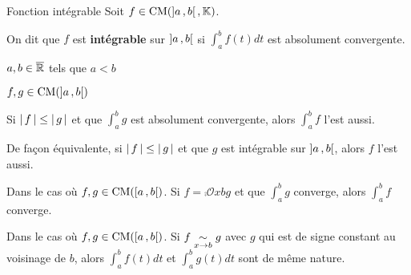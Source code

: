     \begin{defi}{Fonction intégrable}{}
        Soit $f \in \operatorname{CM}(\left] a \, , b \right[, \mathbb{K})$.
    
        On dit que $f$ est \textbf{intégrable} sur $\left] a \, , b \right[$ si $\int_{a}^{b} f(t)dt$ est absolument convergente.
    \end{defi}

    \begin{prop}{}{}
        \begin{soient}
            \begin{multicols}{2}
                \item $a,b \in \overline{\mathbb{R}}$ tels que $a < b$
                \item $f,g \in \operatorname{CM}(\left] a \, , b \right[)$
            \end{multicols}
        \end{soient}
        \begin{alors}
            \item Si $\left\lvert \,f \, \right\rvert \leq \left\lvert \,g \, \right\rvert$ et que $\int_{a}^{b} g$ est absolument convergente, alors $\int_{a}^{b} f$ l’est aussi.
            \item De façon équivalente, si $\left\lvert \,f \, \right\rvert \leq \left\lvert \,g \, \right\rvert$ et que $g$ est intégrable sur $\left] a \, , b \right[$, alors $f$ l’est aussi.
            \item Dans le cas où $f,g \in \operatorname{CM}(\left[ a \, , b \right[)$. Si $f = \comp{\mathcal{O}}{x}{b}{g}$ et que $\int_{a}^{b} g$ converge, alors $\int_{a}^{b} f$ converge.
            \item Dans le cas où $f,g \in \operatorname{CM}(\left[ a \, , b \right[)$. Si $f \underset{x \rightarrow b}{\sim} g$ avec $g$ qui est de signe constant au voisinage de $b$, alors $\int_{a}^{b} f(t)dt$ et $\int_{a}^{b} g(t)dt$ sont de même nature. 
        \end{alors}
    \end{prop}

